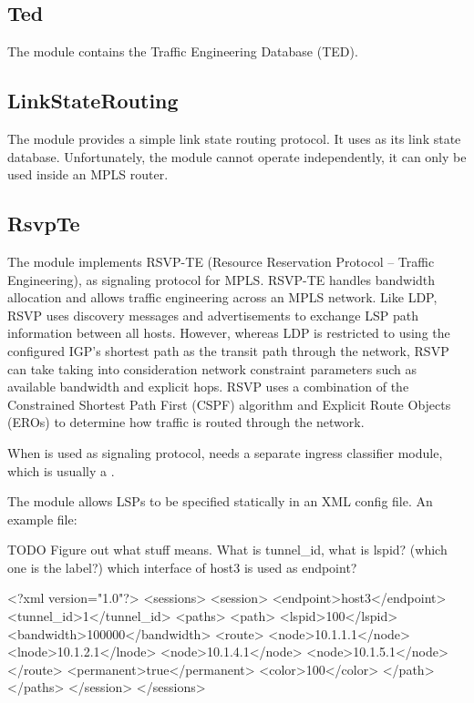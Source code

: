 \subsection{Ted}

The  module contains the Traffic Engineering Database (TED). 

\subsection{LinkStateRouting}

The  module provides a simple link state routing
protocol. It uses  as its link state database. Unfortunately, the
 module cannot operate independently, it can only be
used inside an MPLS router.

 \subsection{RsvpTe}

The  module implements RSVP-TE (Resource Reservation Protocol --
Traffic Engineering), as signaling protocol for MPLS. RSVP-TE handles bandwidth
allocation and allows traffic engineering across an MPLS network. Like LDP, RSVP
uses discovery messages and advertisements to exchange LSP path information
between all hosts. However, whereas LDP is restricted to using the configured
IGP's shortest path as the transit path through the network, RSVP can take
taking into consideration network constraint parameters such as available
bandwidth and explicit hops. RSVP uses a combination of the Constrained Shortest
Path First (CSPF) algorithm and Explicit Route Objects (EROs) to determine how
traffic is routed through the network.

When  is used as signaling protocol,  needs a
separate ingress classifier module, which is usually a .

The  module allows LSPs to be specified statically in an XML
config file. An example  file:

TODO Figure out what stuff means. What is tunnel\_id, what is lspid? (which one is the label?)
which interface of host3 is used as endpoint?

\begin{XML}
<?xml version="1.0"?>
<sessions>
    <session>
        <endpoint>host3</endpoint>
        <tunnel_id>1</tunnel_id>
        <paths>
            <path>
                <lspid>100</lspid>
                <bandwidth>100000</bandwidth>
                <route>
                    <node>10.1.1.1</node>
                    <lnode>10.1.2.1</lnode>
                    <node>10.1.4.1</node>
                    <node>10.1.5.1</node>
                </route>
                <permanent>true</permanent>
                <color>100</color>
            </path>
        </paths>
    </session>
</sessions>
\end{XML}

